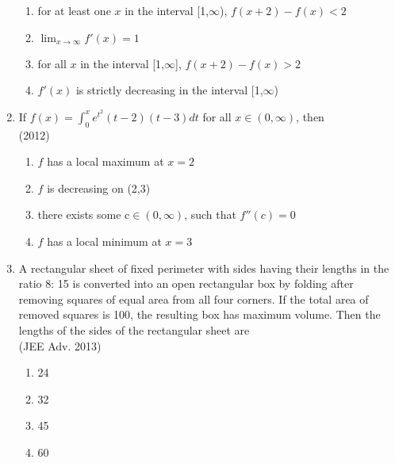 \documentclass[journal,12pt,twocolumn]{IEEEtran}
\theoremstyle{remark}
\begin{document}
\begin{enumerate}
{            \begin{enumerate}
                \item for at least one $x$ in the interval [1,$\infty$), $f(x+2)-f(x)<2$
                \item $\lim_{x\to\infty} f'(x) = 1$
                \item for all $x$ in the interval [1,$\infty$], $f(x+2)-f(x)>2$
                \item $f'(x)$ is strictly decreasing in the interval [1,$\infty$)
            \end{enumerate}
        
        }
    \item{
        
            If $f(x)= \int_{0}^x e^{t^2}(t-2)(t-3)dt$ for all $x \in(0,\infty)$, then
            \\ \text{   } \hfill
                {(2012)}
            
            \begin{enumerate}
                \item $f$ has a local maximum at $x=2$ 
                \item $f$ is decreasing on (2,3)
                \item there exists some c$\in(0,\infty)$, such that $f''(c)=0$
                \item $f$ has a local minimum at $x=3$
            \end{enumerate}
        
        }
    \item{
    
        
            A rectangular sheet of fixed perimeter with sides having their lengths in the ratio 8: 15 is converted into an open rectangular box by folding after removing squares of equal area from all four corners. If the total area of removed squares is 100, the resulting box has maximum volume. Then the lengths of the sides of the rectangular sheet are
            \\ \text{   } \hfill
                {(JEE Adv. 2013)}
            \begin{multicols}{2}
                \begin{enumerate}
                    \item 24
                    \item 32
                    \item 45
                    \item 60
                \end{enumerate}
            \end{multicols}

}
\end{enumerate}
\end{document}
